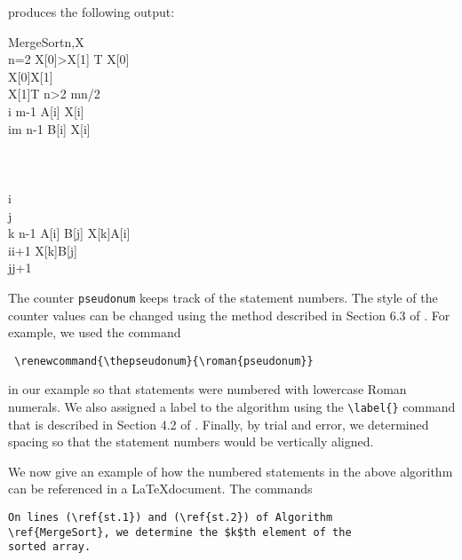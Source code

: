 \documentclass{article}
\begin{document}
\noindent{}produces the following output:

\renewcommand{\thepseudonum}{\roman{pseudonum}}
\begin{pseudocode}{MergeSort}{n,X}
\label{MergeSort}
\\
\IF n=2 \THEN
\BEGIN
  \IF X[0]>X[1] \THEN
  \BEGIN
    T \GETS X[0]\\
    X[0]\GETS X[1]\\
    X[1]\GETS T
  \END
\END
\ELSEIF n>2 \THEN
\BEGIN
  m\GETS \lfloor n/2 \rfloor\\
  \FOR i   \TO m-1 \DO A[i] \GETS X[i]\\
  \FOR i\GETS m \TO n-1 \DO B[i] \GETS X[i]\\
  \\
  \\
  \\
  i\\
  j\\
  \FOR k  \TO n-1 \DO
  \BEGIN
    \IF A[i] \leq B[j] \THEN
    \BEGIN
       X[k]\GETS A[i] \\
       i\GETS i+1
    \END
    \ELSE
    \BEGIN
       X[k]\GETS B[j] \\
       j\GETS j+1
    \END
  \END
\END
\end{pseudocode}

The counter \verb+pseudonum+ keeps track of the statement numbers.
The style of the counter values can be changed using the method
described in Section 6.3 of \cite{lamport}. For example,
we used the command
\begin{center}
\verb+ \renewcommand{\thepseudonum}{\roman{pseudonum}} +
\end{center}
in our example so that statements were numbered with 
lowercase Roman numerals.
We also assigned a label to the algorithm using the
\verb+\label{}+ command that is described in Section 4.2 of \cite{lamport}.
Finally, by trial and error, we determined 
spacing so that the statement numbers would be vertically aligned.

We now give an example of how the numbered statements in the above
algorithm can be referenced in a \LaTeX document.  The commands

\begin{verbatim}
On lines (\ref{st.1}) and (\ref{st.2}) of Algorithm 
\ref{MergeSort}, we determine the $k$th element of the 
sorted array.
\end{verbatim}
\end{document}
